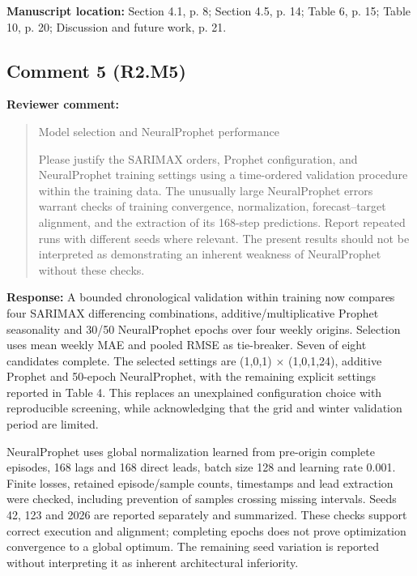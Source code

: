 \documentclass[11pt,a4paper]{article}
\begin{document}
\textbf{Manuscript location:} Section 4.1, p. 8; Section 4.5, p. 14; Table 6, p. 15; Table 10, p. 20; Discussion and future work, p. 21.
\begin{samepage}
\subsection*{Comment 5 (R2.M5)}
\textbf{Reviewer comment:}
\begin{quote}\small Model selection and NeuralProphet performance

Please justify the SARIMAX orders, Prophet configuration, and NeuralProphet training settings using a time-ordered validation procedure within the training data. The unusually large NeuralProphet errors warrant checks of training convergence, normalization, forecast--target alignment, and the extraction of its 168-step predictions. Report repeated runs with different seeds where relevant. The present results should not be interpreted as demonstrating an inherent weakness of NeuralProphet without these checks.\end{quote}
\end{samepage}
\textbf{Response:}
A bounded chronological validation within training now compares four SARIMAX differencing combinations, additive/multiplicative Prophet seasonality and 30/50 NeuralProphet epochs over four weekly origins. Selection uses mean weekly MAE and pooled RMSE as tie-breaker. Seven of eight candidates complete. The selected settings are (1,0,1) $\times$ (1,0,1,24), additive Prophet and 50-epoch NeuralProphet, with the remaining explicit settings reported in Table 4. This replaces an unexplained configuration choice with reproducible screening, while acknowledging that the grid and winter validation period are limited.

NeuralProphet uses global normalization learned from pre-origin complete episodes, 168 lags and 168 direct leads, batch size 128 and learning rate 0.001. Finite losses, retained episode/sample counts, timestamps and lead extraction were checked, including prevention of samples crossing missing intervals. Seeds 42, 123 and 2026 are reported separately and summarized. These checks support correct execution and alignment; completing epochs does not prove optimization convergence to a global optimum. The remaining seed variation is reported without interpreting it as inherent architectural inferiority.
\end{document}
